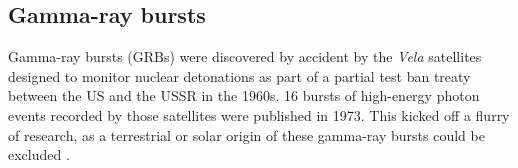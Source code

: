 \documentclass[
    a4paper, %
    fontsize=10pt, %
    twoside=false, %
    numbers=noenddot, %
    fontmethod=tex,
]{kaobook}
\begin{document}
\subsection{Gamma-ray bursts}
Gamma-ray bursts (GRBs) were discovered by accident by the \textit{Vela} satellites designed to monitor nuclear detonations as part of a partial test ban treaty between the US and the USSR in the 1960s. 16 bursts of high-energy photon events recorded by those satellites were published in 1973. This kicked off a flurry of research, as a terrestrial or solar origin of these gamma-ray bursts could be excluded .



% 
% 
% 



\end{document}
